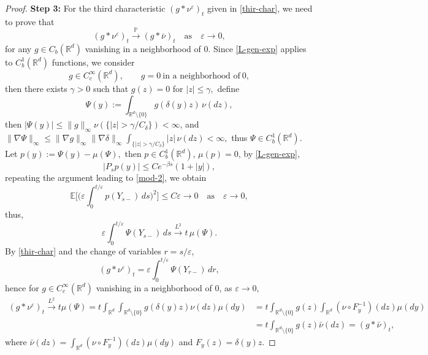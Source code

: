 \documentclass[11pt,reqno]{amsart}
\numberwithin{equation}{section}
\begin{document}
\begin{proof}
	
\textbf{Step 3:}
For the third characteristic $(g*\nu^\varepsilon)_t$ given in
\eqref{thir-char}, we need to prove that
\[
(g*\nu^\varepsilon)_t
\xrightarrow{\mathbb P}
(g*\bar\nu)_t\quad \text{as}\quad \varepsilon\to 0,
\]
for any $g\in C_b(\mathbb R^d)$ vanishing in a neighborhood of  $0$.
Since \eqref{L-gen-exp} applies to $C_b^1(\mathbb R^d)$ functions, we consider
\[
g\in C_c^\infty(\mathbb R^d),\qquad
g=0\ \text{in a neighborhood of}\ 0,
\]
then there exists $\gamma>0$ such that
$
g(z)=0$ for $|z|\leq\gamma,
$ define
\[
\Psi(y):=
\int_{\mathbb R^d\setminus\{0\}}
g(\delta(y)z)\,\nu(dz),
\]
then $ |\Psi(y)|\leq
\|g\|_\infty
\nu(\{|z|>\gamma/C_\delta\})
< \infty$, and $\|\nabla\Psi\|_\infty
\leq
\|\nabla g\|_\infty\|\nabla \delta\|_\infty
\int_{\{|z|>\gamma/C_\delta\}}|z|\,\nu(dz)
<\infty,$ %
thus
$
\Psi\in C_b^1(\mathbb R^d).
$
Let
$
p(y):=\Psi(y)-\mu(\Psi),
$
then $p\in C_b^1(\mathbb R^d)$, $\mu(p)=0$, by
\eqref{L-gen-exp},
\[
|P_s p(y)|\le Ce^{-\beta s}(1+|y|),
\]
repeating the argument leading to \eqref{mod-2}, we obtain
\[
\mathbb E\bigg[
\bigg(\varepsilon\int_0^{t/\varepsilon}p(Y_{s-})\,ds
\bigg)^2\bigg]\le C\varepsilon\longrightarrow0\quad \text{as}\quad \varepsilon\to 0,
\]
thus,
\[
\varepsilon\int_0^{t/\varepsilon}\Psi(Y_{s-})\,ds
\xrightarrow{L^2}t\,\mu(\Psi).
\]
By \eqref{thir-char} and the change of variables $r=s/\varepsilon$,
\[
(g*\nu^\varepsilon)_t=\varepsilon\int_0^{t/\varepsilon}\Psi(Y_{r-})\,dr,
\]
hence for $g\in C_c^\infty(\mathbb R^d)$ vanishing 
in a neighborhood of $0$,    as $\varepsilon\to 0$,
\begin{align}\label{thir}
	(g*\nu^\varepsilon)_t
	\xrightarrow{L^2}
	t\mu(\Psi)=t\int_{\mathbb R^d}	\int_{\mathbb R^d\setminus\{0\}}	g(\delta(y)z)\nu(dz)\mu(dy)&=t\int_{\mathbb R^d\setminus\{0\}}	g(z) \int_{\mathbb R^d}
	\left(\nu\circ F_y^{-1}\right)(dz)\mu(dy)\nonumber\\
	&=t\int_{\mathbb R^d\setminus\{0\}}	g(z) \bar \nu(dz)=(g*\bar \nu)_t,
\end{align}
where $\bar \nu(dz)=\int_{\mathbb R^d}
\left(\nu\circ F_y^{-1}\right)(dz)\mu(dy) $  and $F_y(z)=\delta(y)z$.



\end{proof}
\end{document}
